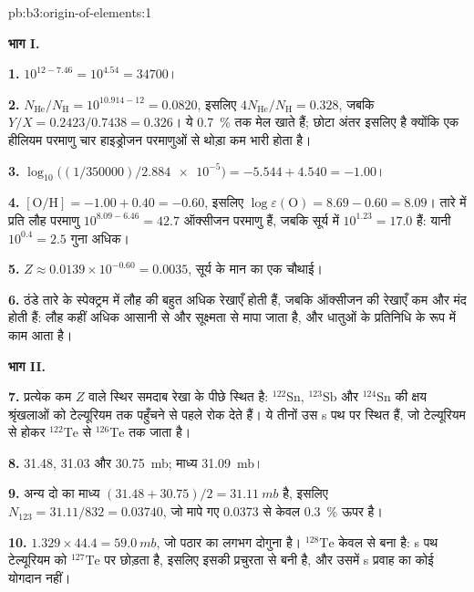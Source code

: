 \begin{solution}{pb:b3:origin-of-elements:1}

\textbf{भाग I.}

\textbf{1.} $10^{12 - 7.46} = 10^{4.54} = \num{34700}$।

\textbf{2.} $N_\mathrm{He}/N_\mathrm{H} = 10^{10.914 - 12} = \num{0.0820}$, इसलिए
$4N_\mathrm{He}/N_\mathrm{H} = \num{0.328}$, जबकि $Y/X =
0.2423/0.7438 = \num{0.326}$। ये \qty{0.7}{\percent} तक मेल खाते हैं; छोटा
अंतर इसलिए है क्योंकि एक हीलियम परमाणु
चार हाइड्रोजन परमाणुओं से थोड़ा कम भारी होता है।

\textbf{3.} $\log_{10}\bigl((1/350000)/\num{2.884e-5}\bigr) = -5.544 + 4.540 =
-1.00$।

\textbf{4.} $[\mathrm{O/H}] = -1.00 + 0.40 = -0.60$, इसलिए
$\log\varepsilon(\mathrm{O}) = 8.69 - 0.60 = 8.09$। तारे में प्रति लौह परमाणु
$10^{8.09 - 6.46} = 42.7$ ऑक्सीजन परमाणु हैं, जबकि
सूर्य में $10^{1.23} = 17.0$ हैं: यानी $10^{0.4} = 2.5$ गुना अधिक।

\textbf{5.} $Z \approx 0.0139\times10^{-0.60} = \num{0.0035}$, सूर्य के
मान का एक चौथाई।

\textbf{6.} ठंडे तारे के स्पेक्ट्रम में लौह की बहुत अधिक रेखाएँ होती हैं, जबकि
ऑक्सीजन की रेखाएँ कम और मंद होती हैं: लौह कहीं अधिक आसानी से
और सूक्ष्मता से मापा जाता है, और धातुओं के प्रतिनिधि के रूप में काम आता है।

\textbf{भाग II.}

\textbf{7.} प्रत्येक कम $Z$ वाले स्थिर समदाब रेखा के पीछे स्थित है:
$^{122}\mathrm{Sn}$, $^{123}\mathrm{Sb}$ और $^{124}\mathrm{Sn}$  की
क्षय श्रृंखलाओं को टेल्यूरियम तक पहुँचने से पहले रोक देते हैं। ये तीनों उस s पथ पर स्थित हैं,
जो टेल्यूरियम से होकर $^{122}\mathrm{Te}$ से
$^{126}\mathrm{Te}$ तक जाता है।

\textbf{8.} \num{31.48}, \num{31.03} और \qty{30.75}{mb}; माध्य
\qty{31.09}{mb}।

\textbf{9.} अन्य दो का माध्य $(31.48 + 30.75)/2 = \qty{31.11}{mb}$ है,
इसलिए $N_{123} = 31.11/832 = \num{0.03740}$, जो मापे गए \num{0.0373} से
केवल \qty{0.3}{\percent} ऊपर है।

\textbf{10.} $1.329\times44.4 = \qty{59.0}{mb}$, जो पठार का लगभग दोगुना है।
$^{128}\mathrm{Te}$ केवल  से बना है: s पथ टेल्यूरियम को
$^{127}\mathrm{Te}$ पर छोड़ता है, इसलिए इसकी प्रचुरता  से बनी है, और
उसमें s प्रवाह का कोई योगदान नहीं।


\end{solution}
